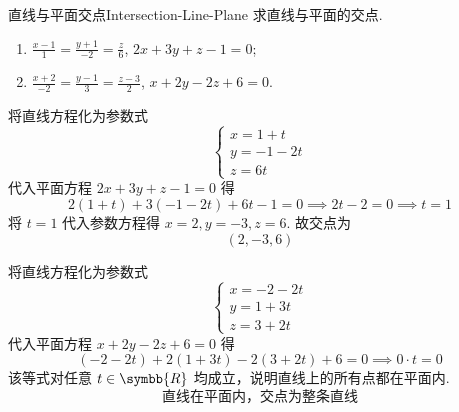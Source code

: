 \begin{problem}{直线与平面交点}{Intersection-Line-Plane}
    求直线与平面的交点.
    \begin{enumerate}
        \item $\frac{x-1}{1} = \frac{y+1}{-2} = \frac{z}{6}$, $2x + 3y + z - 1 = 0$;
        \item $\frac{x+2}{-2} = \frac{y-1}{3} = \frac{z-3}{2}$, $x + 2y - 2z + 6 = 0$.
    \end{enumerate}
\end{problem}

\begin{solution}
    将直线方程化为参数式
    \begin{equation*}
        \begin{cases} x = 1 + t \\ y = -1 - 2t \\ z = 6t \end{cases}
    \end{equation*}
    代入平面方程 $2x + 3y + z - 1 = 0$ 得
    \begin{equation*}
        2(1 + t) + 3(-1 - 2t) + 6t - 1 = 0 \implies 2t - 2 = 0 \implies t = 1
    \end{equation*}
    将 $t = 1$ 代入参数方程得 $x = 2, y = -3, z = 6$. 故交点为
    \begin{equation*}
        \boxed{(2, -3, 6)}
    \end{equation*}

    将直线方程化为参数式
    \begin{equation*}
        \begin{cases} x = -2 - 2t \\ y = 1 + 3t \\ z = 3 + 2t \end{cases}
    \end{equation*}
    代入平面方程 $x + 2y - 2z + 6 = 0$ 得
    \begin{equation*}
        (-2 - 2t) + 2(1 + 3t) - 2(3 + 2t) + 6 = 0 \implies 0 \cdot t = 0
    \end{equation*}
    该等式对任意 $t \in \symbb{R}$ 均成立，说明直线上的所有点都在平面内.
    \begin{equation*}
        \boxed{\text{直线在平面内，交点为整条直线}}
    \end{equation*}
\end{solution}


